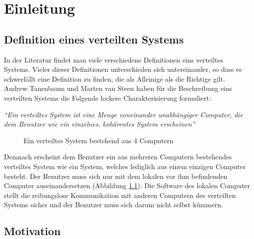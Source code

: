 \chapter{Einleitung}

\section{Definition eines verteilten Systems}

In der Literatur findet man viele verschiedene Definitionen eins verteiltes Systems. Vieler dieser Definitionen unterschieden sich untereinander, so dass es schwerf\"{a}llt eine Definition zu finden, die als Alleinige als die Richtige gilt. Andrew Tanenbaum und Marten van Steen haben f\"{u}r die Beschreibung eins verteilten Systems die Folgende lockere Charakterisierung formuliert:

\cite{Tanenbaum} \textit{``Ein verteiltes System ist eine Menge voneinander unabh\"{a}ngiger Computer, die dem Benutzer wie ein einzelnes, koh\"{a}rentes System erscheinen''}

\begin{figure}[htbp]
	\centering
	\caption{Ein verteiltes System bestehend aus 4 Computern}
	\label{fig:VerteiltesSystem}
\end{figure}

Demnach erscheint dem Benutzer ein aus mehreren Computern bestehendes verteiltes System wie ein System, welches lediglich aus einem einzigen Computer besteht. Der Benutzer muss sich nur mit dem lokalen vor ihm befindenden Computer auseinandersetzen (Abbildung \ref{fig:VerteiltesSystem}). Die Software des lokalen Computer stellt die reibungslose Kommunikation mit anderen Computern des verteilten Systems sicher und der Benutzer muss sich darum nicht selbst k\"{u}mmern.

\section{Motivation}

